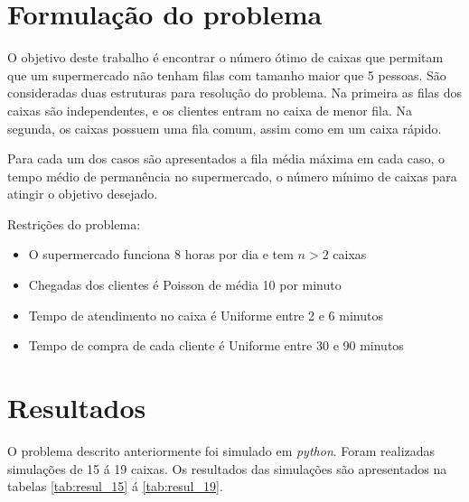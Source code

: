 \chapter{Formulação do problema}
O objetivo deste trabalho é encontrar o número ótimo
de caixas que permitam que um supermercado não tenham filas
com tamanho maior que 5 pessoas. São consideradas duas estruturas
para resolução do problema. Na primeira as filas dos caixas são
independentes, e os clientes entram no caixa de menor fila.
Na segunda, os caixas possuem uma fila comum, assim como em um
caixa rápido.

Para cada um dos casos são apresentados a fila média máxima em cada
caso, o tempo médio de permanência no supermercado, o número mínimo
de caixas para atingir o objetivo desejado.

Restrições do problema:
\begin{itemize}
  \item O supermercado funciona 8 horas por dia e tem $n>2$ caixas
  \item Chegadas dos clientes é Poisson de média 10 por minuto
  \item Tempo de atendimento no caixa é Uniforme entre 2 e 6 minutos
  \item Tempo de compra de cada cliente é Uniforme entre 30 e 90 minutos
\end{itemize}

\chapter{Resultados}\label{cap:resul}
O problema descrito anteriormente foi simulado em \textit{python}. Foram
realizadas simulações de 15 á 19 caixas. Os resultados
das simulações são apresentados na tabelas \ref{tab:resul_15} á \ref{tab:resul_19}.



